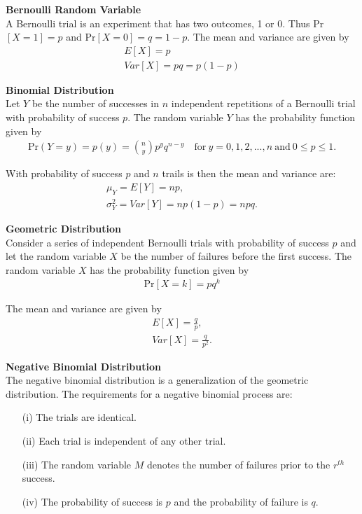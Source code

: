 \documentclass{article}
\numberwithin{theorem}{subsection}
\numberwithin{theorem}{subsubsection}
\numberwithin{lemma}{subsection}
\numberwithin{lemma}{subsubsection}
\theoremstyle{definition}
\numberwithin{definition}{subsection}
\numberwithin{definition}{subsubsection}
\begin{document}
\noindent \textbf{Bernoulli Random Variable}\\
\indent A Bernoulli trial is an experiment that has two outcomes, 1 or 0. Thus Pr$[X=1] = p$ and Pr$[X = 0] = q = 1 - p$. The mean and variance are given by
\begin{gather*}
    E[X] = p\\
    Var[X] = pq = p(1-p)
\end{gather*}

\noindent \textbf{Binomial Distribution} \\
\indent Let $Y$ be the number of successes in $n$ independent repetitions of a Bernoulli trial with probability of success $p$. The random variable $Y$ has the probability function given by
\begin{gather*}
    \text{Pr}(Y=y) = p(y) = {n \choose y}p^{y}q^{n-y} \quad \text{for}\ y=0,1,2,...,n\ \text{and}\ 0 \leq p \leq 1.
\end{gather*}

\noindent With probability of success $p$ and $n$ trails is then the mean and variance are:
\begin{gather*}
    \mu_{Y} = E[Y] = np,\\
    \sigma_{Y}^{2} = Var[Y] = np(1-p) = npq.
\end{gather*}

\noindent \textbf{Geometric Distribution} \\
\indent Consider a series of independent Bernoulli trials with probability of success $p$ and let the random variable $X$ be the number of failures before the first success. The random variable $X$ has the probability function given by
\begin{gather*}
    \text{Pr}[X=k] = pq^k
\end{gather*}

\noindent The mean and variance are given by
\begin{gather*}
    E[X] = \frac{q}{p}, \\
    Var[X] = \frac{q}{p^2}.
\end{gather*}

\noindent \textbf{Negative Binomial Distribution} \\
\indent The negative binomial distribution is a generalization of the geometric distribution. The requirements for a negative binomial process are:
\begin{itemize}
    \item[(i)] The trials are identical.
    \item[(ii)] Each trial is independent of any other trial.
    \item[(iii)] The random variable $M$ denotes the number of failures prior to the $r^{th}$ success.
    \item[(iv)]  The probability of success is $p$ and the probability of failure is $q$.
\end{itemize}
\end{document}
